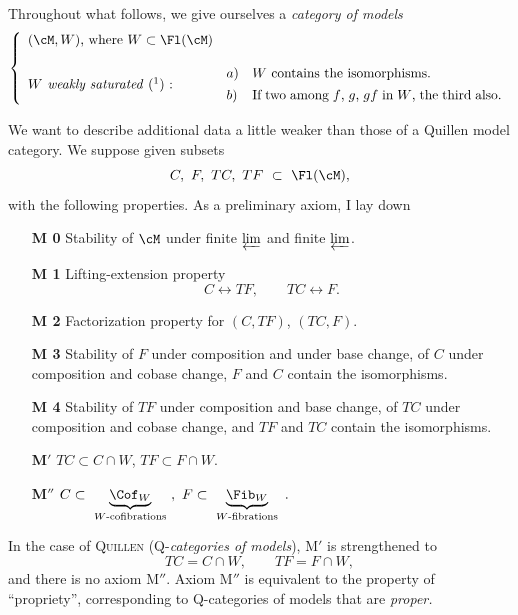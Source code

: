 Throughout what follows, we give ourselves a \textit{category of models}
\[
\left\{
\begin{array}{ll}
\mbox{$(\cM,W)$, where $W\subset\Fl(\cM)$} & \\[3ex]
\mbox{\textit{$W$ weakly saturated} (\footnotemark) :} &
\begin{array}[c]{@{}l@{\quad}p{6.5cm}@{}}
a) & $W$ contains the isomorphisms.\\[1ex]
b) & If two among $f$, $g$, $gf$ in $W$, the third also.
\end{array}
\end{array}
\right.
\]

We want to describe additional data a little weaker than those of a Quillen model category. We suppose given subsets
\[
C,\ F,\ TC,\ TF\ \subset\ \Fl(\cM),
\]
with the following properties. As a preliminary axiom, I lay down

\begin{itemize}[leftmargin=3em,labelsep=0.6em]
\item[\textbf{M 0}] Stability of $\cM$ under finite $\varprojlim$ and finite $\varprojlim$.

\item[\textbf{M 1}]Lifting-extension property
\[
C\longleftrightarrow TF,\qquad TC\longleftrightarrow F.
\]

\item[\textbf{M 2}] Factorization property for $(C,TF)$, $(TC,F)$.

\item[\textbf{M 3}] Stability of $F$ under composition and under base change, of $C$ under composition and cobase change, $F$ and $C$ contain the isomorphisms.

\item[\textbf{M 4}] Stability of $TF$ under composition and base change, of $TC$ under composition and cobase change, and $TF$ and $TC$ contain the isomorphisms.

\item[\textbf{M}$'$] $TC\subset C\cap W$, $TF\subset F\cap W$.

\item[\textbf{M}$''$] $C\subset\ \underbrace{\Cof_W}_{\text{$W$-cofibrations}}\ ,\ F\subset\ \underbrace{\Fib_W}_{\text{$W$-fibrations}}\ .$
\end{itemize}



In the case of \textsc{Quillen} (Q-\textit{categories of models}), M$'$ is strengthened to
\[
TC=C\cap W,\qquad TF=F\cap W,
\]
and there is no axiom M$''$. Axiom M$''$ is equivalent to the property of ``propriety'', corresponding to Q-categories of models that are \textit{proper.}

